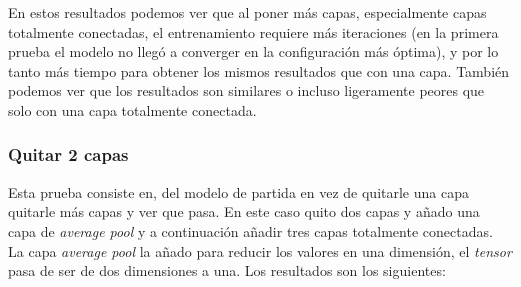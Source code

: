\documentclass[12pt,a4paper]{article}
\begin{document}
\begin{table}[H]
\centering
{}
\caption{Resultados añadir 3 capas totalmente conectadas.}
\end{table}

En estos resultados podemos ver que al poner más capas, especialmente capas totalmente conectadas, el entrenamiento requiere más iteraciones (en la primera prueba el modelo no llegó a converger en la configuración más óptima), y por lo tanto más tiempo para obtener los mismos resultados que con una capa. También podemos ver que los resultados son similares o incluso ligeramente peores que solo con una capa totalmente conectada.

\subsubsection{Quitar 2 capas}
Esta prueba consiste en, del modelo de partida en vez de quitarle una capa quitarle más capas y ver que pasa. En este caso quito dos capas y añado una capa de \textit{average pool} y a continuación añadir tres capas totalmente conectadas. La capa \textit{average pool} la añado para reducir los valores en una dimensión, el \textit{tensor} pasa de ser de dos dimensiones a una. Los resultados son los siguientes:
\end{document}
